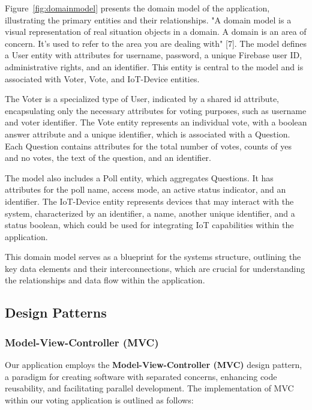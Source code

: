 Figure~\ref{fig:domainmodel} presents the domain model of the application, illustrating the primary entities and their relationships. "A domain model is a visual representation of real situation objects in a domain. A domain is an area of concern. It's used to refer to the area you are dealing with" [7]. The model defines a User entity with attributes for username, password, a unique Firebase user ID, administrative rights, and an identifier. This entity is central to the model and is associated with Voter, Vote, and IoT-Device entities.

The Voter is a specialized type of User, indicated by a shared id attribute, encapsulating only the necessary attributes for voting purposes, such as username and voter identifier. The Vote entity represents an individual vote, with a boolean answer attribute and a unique identifier, which is associated with a Question. Each Question contains attributes for the total number of votes, counts of yes and no votes, the text of the question, and an identifier.

The model also includes a Poll entity, which aggregates Questions. It has attributes for the poll name, access mode, an active status indicator, and an identifier. The IoT-Device entity represents devices that may interact with the system, characterized by an identifier, a name, another unique identifier, and a status boolean, which could be used for integrating IoT capabilities within the application.

This domain model serves as a blueprint for the systems structure, outlining the key data elements and their interconnections, which are crucial for understanding the relationships and data flow within the application.

\subsection{Design Patterns}

\subsubsection{Model-View-Controller (MVC)}

Our application employs the \textbf{Model-View-Controller (MVC)} design pattern, a paradigm for creating software with separated concerns, enhancing code reusability, and facilitating parallel development. The implementation of MVC within our voting application is outlined as follows:

